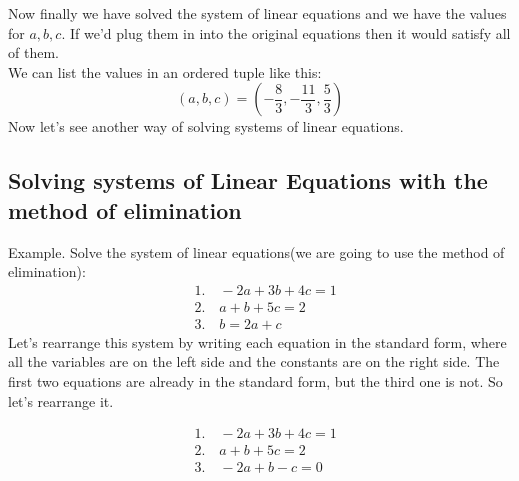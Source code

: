 Now finally we have solved the system of linear equations and we have the values for $a, b, c$. If we'd plug them in into the original equations then it would satisfy all of them. \\ 
We can list the values in an ordered tuple like this:
$$ {\displaystyle (a,b,c)=(-\frac{8}{3},-\frac{11}{3},\frac{5}{3})} $$
Now let's see another way of solving systems of linear equations.
\subsection{Solving systems of Linear Equations with the method of elimination}
Example. Solve the system of linear equations(we are going to use the method of elimination): 
\begin{align*}
    &1. \quad -2a + 3b + 4c = 1 \\
    &2. \quad a + b + 5c = 2 \\ 
    &3. \quad  b = 2a + c   
\end{align*}
Let's rearrange this system by writing each equation in the standard form, where all the variables are on the left side and the constants are on the right side.
The first two equations are already in the standard form, but the third one is not. So let's rearrange it.

\begin{align*}
    &1. \quad -2a + 3b + 4c = 1 \\
    &2. \quad a + b + 5c = 2 \\ 
    &3. \quad  -2a + b - c = 0  
\end{align*}